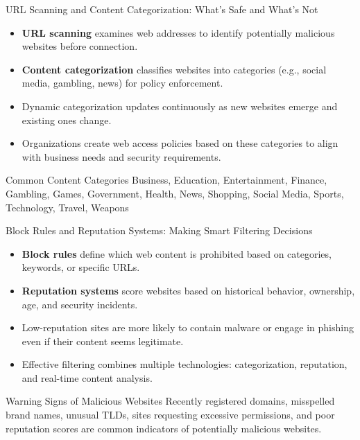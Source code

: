 \documentclass{beamer}
\begin{document}
\begin{frame}{URL Scanning and Content Categorization: What's Safe and What's Not}
\begin{itemize}
\item \textbf{URL scanning} examines web addresses to identify potentially malicious websites before connection.
\item \textbf{Content categorization} classifies websites into categories (e.g., social media, gambling, news) for policy enforcement.
\item Dynamic categorization updates continuously as new websites emerge and existing ones change.
\item Organizations create web access policies based on these categories to align with business needs and security requirements.
\end{itemize}

\begin{block}{Common Content Categories}
Business, Education, Entertainment, Finance, Gambling, Games, Government, Health, News, Shopping, Social Media, Sports, Technology, Travel, Weapons
\end{block}
\end{frame}

\begin{frame}{Block Rules and Reputation Systems: Making Smart Filtering Decisions}
\begin{itemize}
\item \textbf{Block rules} define which web content is prohibited based on categories, keywords, or specific URLs.
\item \textbf{Reputation systems} score websites based on historical behavior, ownership, age, and security incidents.
\item Low-reputation sites are more likely to contain malware or engage in phishing even if their content seems legitimate.
\item Effective filtering combines multiple technologies: categorization, reputation, and real-time content analysis.
\end{itemize}

\begin{alertblock}{Warning Signs of Malicious Websites}
Recently registered domains, misspelled brand names, unusual TLDs, sites requesting excessive permissions, and poor reputation scores are common indicators of potentially malicious websites.
\end{alertblock}
\end{frame}
\end{document}
